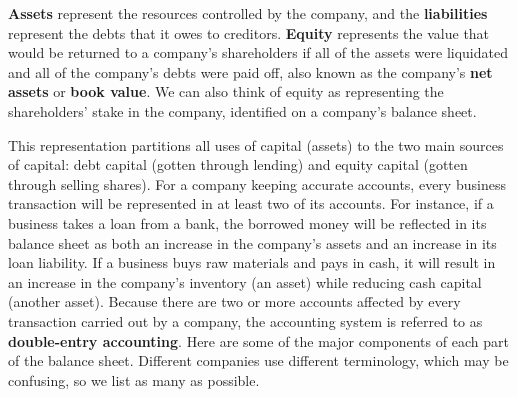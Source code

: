\documentclass{article}
\begin{document}
    \textbf{Assets} represent the resources controlled by the company, and the \textbf{liabilities} represent the debts that it owes to creditors. \textbf{Equity} represents the value that would be returned to a company's shareholders if all of the assets were liquidated and all of the company's debts were paid off, also known as the company's \textbf{net assets} or \textbf{book value}. We can also think of equity as representing the shareholders' stake in the company, identified on a company's balance sheet.

    This representation partitions all uses of capital (assets) to the two main sources of capital: debt capital (gotten through lending) and equity capital (gotten through selling shares). For a company keeping accurate accounts, every business transaction will be represented in at least two of its accounts. For instance, if a business takes a loan from a bank, the borrowed money will be reflected in its balance sheet as both an increase in the company's assets and an increase in its loan liability. If a business buys raw materials and pays in cash, it will result in an increase in the company's inventory (an asset) while reducing cash capital (another asset). Because there are two or more accounts affected by every transaction carried out by a company, the accounting system is referred to as \textbf{double-entry accounting}. Here are some of the major components of each part of the balance sheet. Different companies use different terminology, which may be confusing, so we list as many as possible.
\end{document}
